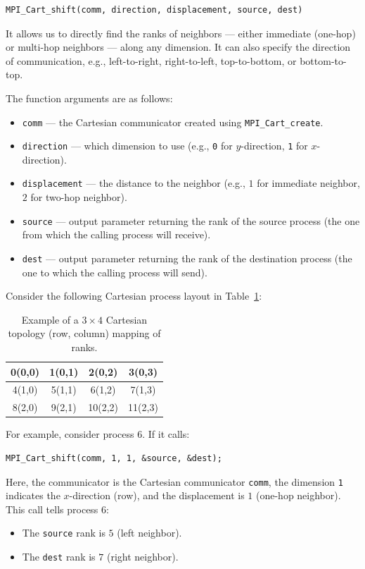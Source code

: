 \documentclass[12pt]{book}
\begin{document}
\begin{lstlisting}[style=cppstyle]
MPI_Cart_shift(comm, direction, displacement, source, dest)
\end{lstlisting}

It allows us to directly find the ranks of neighbors --- either immediate (one-hop) or multi-hop neighbors --- along any dimension. It can also specify the direction of communication, e.g., left-to-right, right-to-left, top-to-bottom, or bottom-to-top.

The function arguments are as follows:
\begin{itemize}
    \item \texttt{comm} --- the Cartesian communicator created using \texttt{MPI\_Cart\_create}.
    \item \texttt{direction} --- which dimension to use (e.g., \texttt{0} for $y$-direction, \texttt{1} for $x$-direction).
    \item \texttt{displacement} --- the distance to the neighbor (e.g., $1$ for immediate neighbor, $2$ for two-hop neighbor).
    \item \texttt{source} --- output parameter returning the rank of the source process (the one from which the calling process will receive).
    \item \texttt{dest} --- output parameter returning the rank of the destination process (the one to which the calling process will send).
\end{itemize}

Consider the following Cartesian process layout in Table~\ref{tab:mpicartshift}:

\begin{table}[H]
    \centering
    \begin{tabular}{|c|c|c|c|}
    \hline
        0(0,0) & 1(0,1) & 2(0,2) & 3(0,3) \\
    \hline
        4(1,0) & 5(1,1) & 6(1,2) & 7(1,3) \\
    \hline
        8(2,0) & 9(2,1) & 10(2,2) & 11(2,3) \\
    \hline
    \end{tabular}
    \caption{Example of a $3 \times 4$ Cartesian topology (row, column) mapping of ranks.}
    \label{tab:mpicartshift}
\end{table}

For example, consider process $6$. If it calls:
\begin{lstlisting}[style=cppstyle]
MPI_Cart_shift(comm, 1, 1, &source, &dest);
\end{lstlisting}
Here, the communicator is the Cartesian communicator \texttt{comm}, the dimension \texttt{1} indicates the $x$-direction (row), and the displacement is $1$ (one-hop neighbor). This call tells process $6$:
\begin{itemize}
    \item The \texttt{source} rank is $5$ (left neighbor).
    \item The \texttt{dest} rank is $7$ (right neighbor).
\end{itemize}
\end{document}
